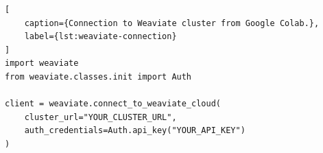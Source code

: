 \begin{lstlisting}[
    caption={Connection to Weaviate cluster from Google Colab.},
    label={lst:weaviate-connection}
]
import weaviate
from weaviate.classes.init import Auth

client = weaviate.connect_to_weaviate_cloud(
    cluster_url="YOUR_CLUSTER_URL",
    auth_credentials=Auth.api_key("YOUR_API_KEY")
)
\end{lstlisting}